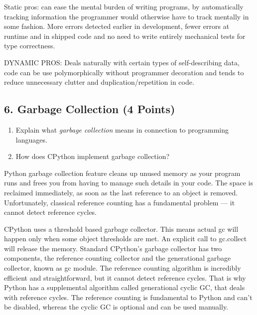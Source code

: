 \documentclass[11pt]{article}
\begin{document}
Static pros: can ease the mental burden of writing programs, by
automatically tracking information the programmer would otherwise have
to track mentally in some fashion. More errors detected earlier in
development, fewer errors at runtime and in shipped code and no need to
write entirely mechanical tests for type correctness.

DYNAMIC PROS: Deals naturally with certain types of self-describing
data, code can be use polymorphically without programmer decoration and
tends to reduce unnecessary clutter and duplication/repetition in code.

    \hypertarget{garbage-collection-4-points}{%
\subsection{6. Garbage Collection (4
Points)}\label{garbage-collection-4-points}}

\begin{enumerate}
\def\labelenumi{\alph{enumi}.}
\item
  Explain what \emph{garbage collection} means in connection to
  programming languages.
\item
  How does CPython implement garbage collection?
\end{enumerate}

    Python garbage collection feature cleans up unused memory as your
program runs and frees you from having to manage such details in your
code. The space is reclaimed immediately, as soon as the last reference
to an object is removed. Unfortunately, classical reference counting has
a fundamental problem --- it cannot detect reference cycles.

CPython uses a threshold based garbage collector. This means actual gc
will happen only when some object thresholds are met. An explicit call
to gc.collect will release the memory. Standard CPython's garbage
collector has two components, the reference counting collector and the
generational garbage collector, known as gc module. The reference
counting algorithm is incredibly efficient and straightforward, but it
cannot detect reference cycles. That is why Python has a supplemental
algorithm called generational cyclic GC, that deals with reference
cycles. The reference counting is fundamental to Python and can't be
disabled, whereas the cyclic GC is optional and can be used manually.


    
    
    
    
\end{document}
